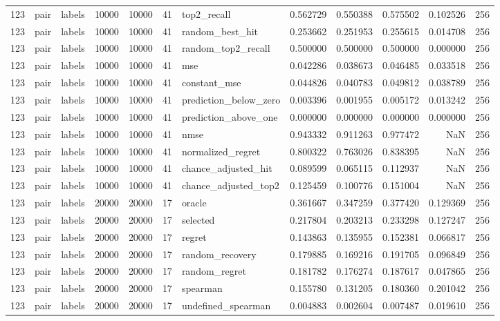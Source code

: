 \begin{tabular}{rllrrrlrrrrr}
123 & pair & labels & 10000 & 10000 & 41 & top2_recall & 0.562729 & 0.550388 & 0.575502 & 0.102526 & 256 \\
123 & pair & labels & 10000 & 10000 & 41 & random_best_hit & 0.253662 & 0.251953 & 0.255615 & 0.014708 & 256 \\
123 & pair & labels & 10000 & 10000 & 41 & random_top2_recall & 0.500000 & 0.500000 & 0.500000 & 0.000000 & 256 \\
123 & pair & labels & 10000 & 10000 & 41 & mse & 0.042286 & 0.038673 & 0.046485 & 0.033518 & 256 \\
123 & pair & labels & 10000 & 10000 & 41 & constant_mse & 0.044826 & 0.040783 & 0.049812 & 0.038789 & 256 \\
123 & pair & labels & 10000 & 10000 & 41 & prediction_below_zero & 0.003396 & 0.001955 & 0.005172 & 0.013242 & 256 \\
123 & pair & labels & 10000 & 10000 & 41 & prediction_above_one & 0.000000 & 0.000000 & 0.000000 & 0.000000 & 256 \\
123 & pair & labels & 10000 & 10000 & 41 & nmse & 0.943332 & 0.911263 & 0.977472 & NaN & 256 \\
123 & pair & labels & 10000 & 10000 & 41 & normalized_regret & 0.800322 & 0.763026 & 0.838395 & NaN & 256 \\
123 & pair & labels & 10000 & 10000 & 41 & chance_adjusted_hit & 0.089599 & 0.065115 & 0.112937 & NaN & 256 \\
123 & pair & labels & 10000 & 10000 & 41 & chance_adjusted_top2 & 0.125459 & 0.100776 & 0.151004 & NaN & 256 \\
123 & pair & labels & 20000 & 20000 & 17 & oracle & 0.361667 & 0.347259 & 0.377420 & 0.129369 & 256 \\
123 & pair & labels & 20000 & 20000 & 17 & selected & 0.217804 & 0.203213 & 0.233298 & 0.127247 & 256 \\
123 & pair & labels & 20000 & 20000 & 17 & regret & 0.143863 & 0.135955 & 0.152381 & 0.066817 & 256 \\
123 & pair & labels & 20000 & 20000 & 17 & random_recovery & 0.179885 & 0.169216 & 0.191705 & 0.096849 & 256 \\
123 & pair & labels & 20000 & 20000 & 17 & random_regret & 0.181782 & 0.176274 & 0.187617 & 0.047865 & 256 \\
123 & pair & labels & 20000 & 20000 & 17 & spearman & 0.155780 & 0.131205 & 0.180360 & 0.201042 & 256 \\
123 & pair & labels & 20000 & 20000 & 17 & undefined_spearman & 0.004883 & 0.002604 & 0.007487 & 0.019610 & 256 \\

\end{tabular}
